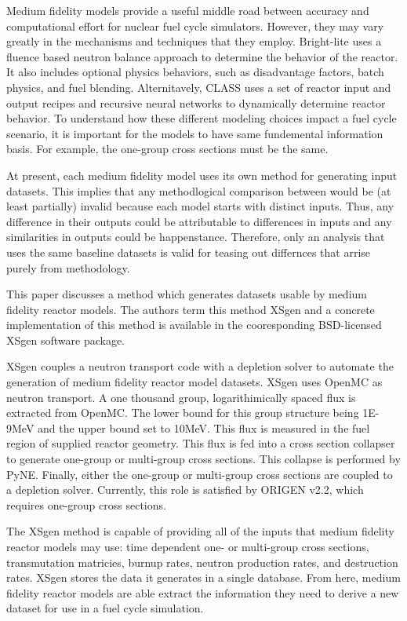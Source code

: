\documentclass{article}
\begin{document}
Medium fidelity models provide a useful middle road between accuracy and computational effort
for nuclear fuel cycle simulators. However, they may vary greatly in the mechanisms and
techniques that they employ. Bright-lite uses a fluence based neutron balance approach to
determine the behavior of the reactor. It also includes optional physics behaviors, such as
disadvantage factors, batch physics, and fuel blending. Alternitavely, CLASS uses a set of
reactor input and output recipes and recursive neural networks\cite{classneural} to dynamically determine
reactor behavior. To understand how these different modeling choices impact a fuel cycle
scenario, it is important for the models to have same fundemental information basis.
For example, the one-group cross sections must be the same.

At present, each medium fidelity model uses its own method for generating input datasets.
This implies that any methodlogical comparison between would be (at least partially) invalid
because each model starts with distinct inputs. Thus, any difference in their outputs
could be attributable to differences in inputs and any similarities in outputs could be
happenstance. Therefore, only an analysis that uses the same baseline datasets
is valid for teasing out differnces that arrise purely from methodology.

This paper discusses a method which generates datasets usable by medium fidelity reactor models.
The authors term this method XSgen and a concrete implementation of this method is available
in the cooresponding BSD-licensed XSgen software package\cite{xsgen}.

XSgen couples a neutron transport code with a depletion solver to automate the generation of
medium fidelity reactor model datasets. XSgen uses OpenMC\cite{openmc} as neutron transport.
A one thousand group, logarithimically spaced flux is extracted from OpenMC. The lower bound for 
this group structure being 1E-9MeV and the upper bound set to 10MeV. This flux is
measured in the fuel region of supplied reactor geometry. This flux is fed into a cross
section collapser to generate one-group or multi-group cross sections. This collapse is
performed by PyNE\cite{pyne}. Finally, either the
one-group or multi-group cross sections are coupled to a depletion solver. Currently, this
role is satisfied by ORIGEN v2.2\cite{origen2}, which requires one-group cross sections.

The XSgen method is capable of providing all of the inputs that medium fidelity reactor models
may use: time dependent one- or multi-group cross sections, transmutation matricies,
burnup rates, neutron production rates, and destruction rates.
XSgen stores the data it generates in a single database.
From here, medium fidelity reactor models are able extract the information they need to
derive a new dataset for use in a fuel cycle simulation.
\end{document}
